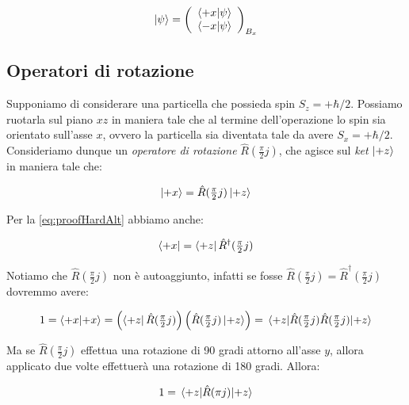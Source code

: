 	\begin{equation}
		\ket{\psi} =
			\left ( \begin{array}{c}
				\braket{+x}{\psi} \\
				\braket{-x}{\psi}
			\end{array} \right )_{B_x}
	\end{equation}

\subsection{Operatori di rotazione}

Supponiamo di considerare una particella che possieda spin $S_z = + \hbar / 2$. Possiamo ruotarla sul piano $xz$ in maniera tale che al termine dell'operazione lo spin sia orientato sull'asse $x$, ovvero la particella sia diventata tale da avere $S_x = + \hbar / 2 $. Consideriamo dunque un \textit{operatore di rotazione} $\hat{R}(\frac{\pi}{2} j)$, che agisce sul \textit{ket} $\ket{+z}$ in maniera tale che:

	\begin{equation} \label{eq:rotationOperatorGeneric}
		\ket{+x} = \hat{R}(\tfrac{\pi}{2} j) \ket{+z}
	\end{equation} 

Per la \eqref{eq:proofHardAlt} abbiamo anche:

	\begin{equation} \label{eq:rotationOperatorAdjoint}
		\bra{+x} = \bra{+z} \hat{R}^\dagger(\tfrac{\pi}{2} j)
	\end{equation}

	Notiamo che $ \hat{R}( \tfrac{\pi}{2} j) $ non \`e autoaggiunto, infatti se fosse $ \hat{R}(\tfrac{\pi}{2} j) = \hat{R}^\dagger(\tfrac{\pi}{2} j)$ dovremmo avere:
	
	\begin{equation}
	 	1 = \braket{+x}{+x} = \left( \bra{+z} \hat{R}(\tfrac{\pi}{2} j) \right ) \left (\hat{R}(\tfrac{\pi}{2} j) \ket{+z} \right ) = \mel{+z}{\hat{R}(\tfrac{\pi}{2} j)\hat{R}(\tfrac{\pi}{2} j) }{+z} 
	\end{equation} 

Ma se $ \hat{R}(\tfrac{\pi}{2} j )$ effettua una rotazione di 90 gradi attorno all'asse $y$, allora applicato due volte effettuer\`a una rotazione di 180 gradi. Allora:

	\begin{equation} \label{eq:rotationNotHermitian}
		1 = \mel{+z}{\hat{R}(\pi j ) }{+z}
	\end{equation}


